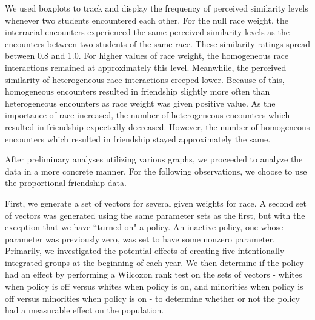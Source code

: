We used boxplots to track and display the frequency of perceived similarity levels whenever two students encountered each 
other. For the null race weight, the interracial encounters experienced the same perceived similarity levels as the 
encounters between two students of the same race. These similarity ratings spread between 0.8 and 1.0. For higher values of 
race weight, the homogeneous race interactions remained at approximately this level. Meanwhile, the perceived similarity of 
heterogeneous race interactions creeped lower. Because of this, homogeneous encounters resulted in friendship slightly more 
often than heterogeneous encounters as race weight was given positive value. As the importance of race increased, the number 
of heterogeneous encounters which resulted in friendship expectedly decreased. However, the number of homogeneous encounters 
which resulted in friendship stayed approximately the same.

After preliminary analyses utilizing various graphs, we proceeded to analyze the data in a more concrete manner. For the following observations, we 
choose to use the proportional friendship data.



First, we generate a set of vectors for several given weights for race. A second set of vectors was generated using the same parameter sets as the first, but with the 
exception that we have ``turned on" a policy. An inactive policy, one whose parameter was previously zero, was set to have some nonzero parameter. Primarily, 
we investigated the potential effects of creating five intentionally integrated groups at the beginning of each year. We then 
determine if the policy had an effect by performing a Wilcoxon rank test on the sets of vectors - whites when policy is off versus whites when policy is on, and minorities when policy is off 
versus minorities when policy is on - to determine whether or not the policy had a measurable effect on the population.

